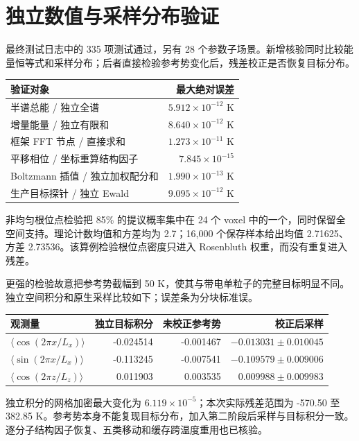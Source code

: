 \section{独立数值与采样分布验证}

最终测试日志中的 335 项测试通过，另有 28 个参数子场景。新增核验同时比较能量恒等式和采样分布；后者直接检验参考势变化后，残差校正是否恢复目标分布。

\begin{center}\small
\begin{tabular}{@{}lr@{}}\toprule
验证对象 & 最大绝对误差\\\midrule
半谱总能 / 独立全谱 & $5.912\times10^{-12}$ K\\
增量能量 / 独立有限和 & $8.640\times10^{-12}$ K\\
框架 FFT 节点 / 直接求和 & $1.273\times10^{-11}$ K\\
平移相位 / 坐标重算结构因子 & $7.845\times10^{-15}$\\
Boltzmann 插值 / 独立加权配分和 & $1.990\times10^{-13}$ K\\
生产目标探针 / 独立 Ewald & $9.095\times10^{-12}$ K\\
\bottomrule\end{tabular}\end{center}

非均匀根位点检验把 85\% 的提议概率集中在 24 个 voxel 中的一个，同时保留全空间支持。理论计数均值和方差均为 2.7；16,000 个保存样本给出均值 2.71625、方差 2.73536。该算例检验根位点密度只进入 Rosenbluth 权重，而没有重复进入残差。

更强的检验故意把参考势截幅到 50 K，使其与带电单粒子的完整目标明显不同。独立空间积分和原生采样比较如下；误差条为分块标准误。

\begin{center}\small
\begin{tabular}{@{}lrrr@{}}\toprule
观测量 & 独立目标积分 & 未校正参考势 & 校正后采样\\\midrule
$\langle \cos(2\pi x/L_x)\rangle$ & -0.024514 & -0.001467 & $-0.013031\pm0.010045$\\
$\langle \sin(2\pi x/L_x)\rangle$ & -0.113245 & -0.007541 & $-0.109579\pm0.009006$\\
$\langle \cos(2\pi z/L_z)\rangle$ & 0.011903 & 0.003535 & $0.009988\pm0.009983$\\
\bottomrule\end{tabular}\end{center}

独立积分的网格加密最大变化为 $6.119\times10^{-5}$；本次实际残差范围为 -570.50 至 382.85 K。参考势本身不能复现目标分布，加入第二阶段后采样与目标积分一致。逐分子结构因子恢复、五类移动和缓存跨温度重用也已核验。

